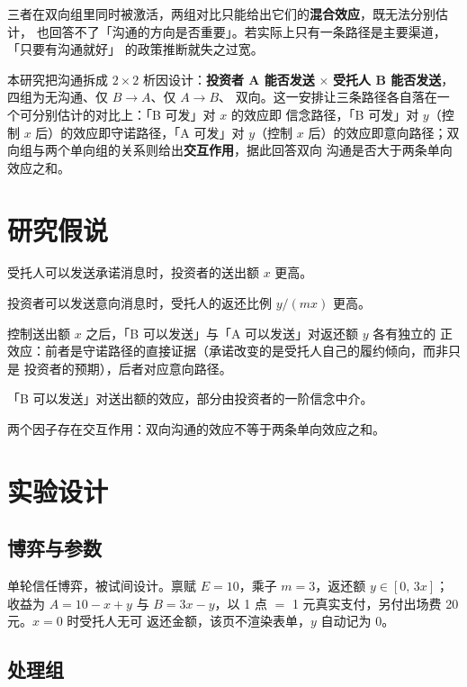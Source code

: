 \documentclass[10pt,a4paper]{ctexart}
\begin{document}
三者在双向组里同时被激活，两组对比只能给出它们的\textbf{混合效应}，既无法分别估计，
也回答不了「沟通的方向是否重要」。若实际上只有一条路径是主要渠道，「只要有沟通就好」
的政策推断就失之过宽。

本研究把沟通拆成 $2\times2$ 析因设计：\textbf{投资者 A 能否发送} $\times$
\textbf{受托人 B 能否发送}，四组为无沟通、仅 $B\!\rightarrow\!A$、仅 $A\!\rightarrow\!B$、
双向。这一安排让三条路径各自落在一个可分别估计的对比上：「B 可发」对 $x$ 的效应即
信念路径，「B 可发」对 $y$（控制 $x$ 后）的效应即守诺路径，「A 可发」对 $y$（控制 $x$
后）的效应即意向路径；双向组与两个单向组的关系则给出\textbf{交互作用}，据此回答双向
沟通是否大于两条单向效应之和。

\section{研究假说}

\begin{description}[style=nextline]
  \item[H1（主结果）] 受托人可以发送承诺消息时，投资者的送出额 $x$ 更高。
  \item[H2] 投资者可以发送意向消息时，受托人的返还比例 $y/(mx)$ 更高。
  \item[H3] 控制送出额 $x$ 之后，「B 可以发送」与「A 可以发送」对返还额 $y$ 各有独立的
        正效应：前者是守诺路径的直接证据（承诺改变的是受托人自己的履约倾向，而非只是
        投资者的预期），后者对应意向路径。
  \item[H4] 「B 可以发送」对送出额的效应，部分由投资者的一阶信念中介。
  \item[H5（探索性）] 两个因子存在交互作用：双向沟通的效应不等于两条单向效应之和。
\end{description}

\section{实验设计}

\subsection{博弈与参数}

单轮信任博弈，被试间设计。禀赋 $E=10$，乘子 $m=3$，返还额 $y\in[0,\,3x]$；收益为
$A=10-x+y$ 与 $B=3x-y$，以 1 点 $=$ 1 元真实支付，另付出场费 20 元。$x=0$ 时受托人无可
返还金额，该页不渲染表单，$y$ 自动记为 0。

\subsection{处理组}
\end{document}
